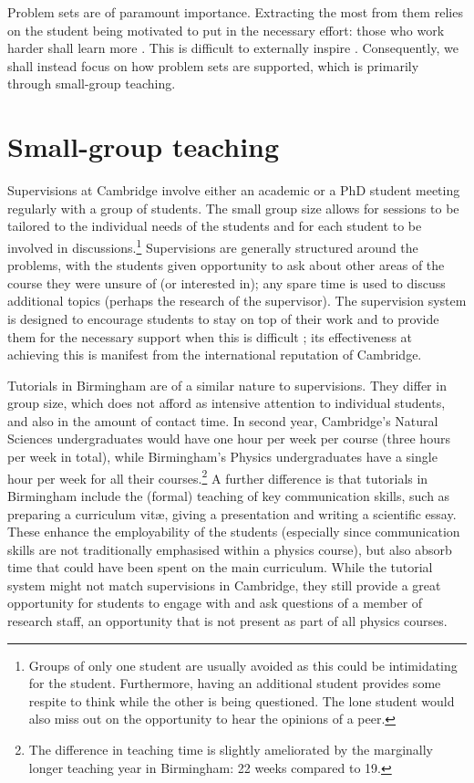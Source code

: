 \documentclass[a4paper, 11pt, twoside]{article}
\begin{document}
Problem sets are of paramount importance. Extracting the most from them relies on the student being motivated to put in the necessary effort: those who work harder shall learn more \citep{Gibbs2015}. This is difficult to externally inspire \citep[cf.][]{Ryan2000}. Consequently, we shall instead focus on how problem sets are supported, which is primarily through small-group teaching.

\section{Small-group teaching}\label{sec:small}

Supervisions at Cambridge involve either an academic or a PhD student meeting regularly with a group of students. The small group size allows for sessions to be tailored to the individual needs of the students and for each student to be involved in discussions.\footnote{Groups of only one student are usually avoided as this could be intimidating for the student. Furthermore, having an additional student provides some respite to think while the other is being questioned. The lone student would also miss out on the opportunity to hear the opinions of a peer.} Supervisions are generally structured around the problems, with the students given opportunity to ask about other areas of the course they were unsure of (or interested in); any spare time is used to discuss additional topics (perhaps the research of the supervisor). The supervision system is designed to encourage students to stay on top of their work and to provide them for the necessary support when this is difficult \citep[case study 12.1]{Gibbs2015}; its effectiveness at achieving this is manifest from the international reputation of Cambridge.

Tutorials in Birmingham are of a similar nature to supervisions. They differ in group size, which does not afford as intensive attention to individual students, and also in the amount of contact time. In second year, Cambridge's Natural Sciences undergraduates would have one hour per week per course (three hours per week in total), while Birmingham's Physics undergraduates have a single hour per week for all their courses.\footnote{The difference in teaching time is slightly ameliorated by the marginally longer teaching year in Birmingham: 22 weeks compared to 19.} A further difference is that tutorials in Birmingham include the (formal) teaching of key communication skills, such as preparing a curriculum vit\ae, giving a presentation and writing a scientific essay. These enhance the employability of the students (especially since communication skills are not traditionally emphasised within a physics course), but also absorb time that could have been spent on the main curriculum. While the tutorial system might not match supervisions in Cambridge, they still provide a great opportunity for students to engage with and ask questions of a member of research staff, an opportunity that is not present as part of all physics courses.
\end{document}
